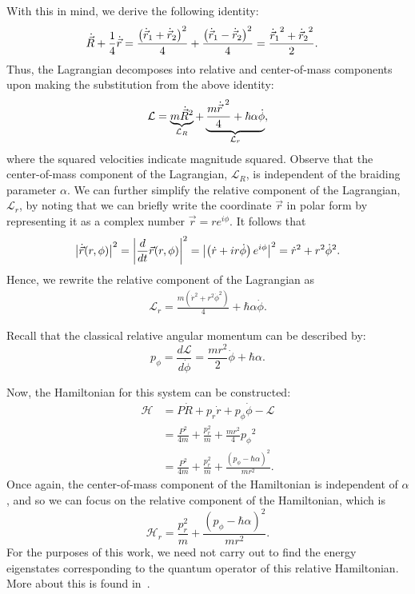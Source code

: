 With this in mind, we derive the following identity:
\begin{align}
    \dot{\vec{R}} + \frac{1}{4}\dot{\vec{r}} &= \frac{{\left( \dot{\vec{r}}_1 + \dot{\vec{r}}_2 \right)}^2}{4} + \frac{{\left( \dot{\vec{r}}_1 - \dot{\vec{r}}_2 \right)}^2}{4} = \frac{{\dot{\vec{r}}_1}^2 + {\dot{\vec{r}}_2}^2}{2}.
\end{align}
Thus, the Lagrangian decomposes into relative and center-of-mass components upon making the substitution from the above identity:
\begin{align}
    \mathcal{L} = \underbrace{m\dot{\vec{R}}^2}_{\mathcal{L}_R} + \underbrace{\frac{m{\dot{\vec{r}}}^{\;2}}{4} + \hbar\alpha\dot{\phi}}_{\mathcal{L}_r},
\end{align}
where the squared velocities indicate magnitude squared. Observe that the center-of-mass component of the Lagrangian, $\mathcal{L}_R$, is independent of the braiding parameter $\alpha$. We can further simplify the relative component of the Lagrangian, $\mathcal{L}_r$, by noting that we can briefly write the coordinate $\vec{r}$ in polar form by representing it as a complex number $\vec{r} =r e^{i\phi}$. It follows that
\begin{align}
    \left|\dot{\vec{r}}(r,\phi)\right|^2 = \left|\frac{d}{dt}\vec{r}(r,\phi)\right|^2 = \left|\left( \dot{r} + ir\dot{\phi} \right)e^{i\phi}\right|^2 = \dot{r}^2 + r^2\dot{\phi}^2.
\end{align}
Hence, we rewrite the relative component of the Lagrangian as
\begin{align}
    \mathcal{L}_r = \frac{m\left( \dot{r}^2 + r^2\dot{\phi}^2 \right)}{4} + \hbar\alpha\dot{\phi}.\label{eq:basic_Lr}
\end{align}

Recall that the classical relative angular momentum can be described by:
\begin{equation}
    p_\phi = \frac{d\mathcal{L}}{d\dot{\phi}} = \frac{mr^2}{2}\dot{\phi} + \hbar\alpha.
\end{equation}

Now, the Hamiltonian for this system can be constructed:
\begin{align}
    \mathcal{H} 
    &= P\dot{R} + p_r\dot{r} + p_\phi\dot{\phi} - \mathcal{L} \nonumber \\
    &= \frac{P^2}{4m} + \frac{p_r^{2}}{m} + \frac{mr^2}{4} {p_\phi}^2 \nonumber \\
    &= \frac{P^2}{4m} + \frac{p_r^{2}}{m} + \frac{{\left( p_\phi - \hbar\alpha \right)}^2}{mr^2}.
\end{align}
Once again, the center-of-mass component of the Hamiltonian is independent of $\alpha$, and so we can focus on the relative component of the Hamiltonian, which is
\begin{equation}
    \mathcal{H}_r = \frac{p_r^{2}}{m} + \frac{{\left( p_\phi - \hbar\alpha \right)}^2}{mr^2}.\label{eq:basic_Hr}
\end{equation}
For the purposes of this work, we need not carry out to find the energy eigenstates corresponding to the quantum operator of this relative Hamiltonian. More about this is found in~\cite{Khare2005}.


